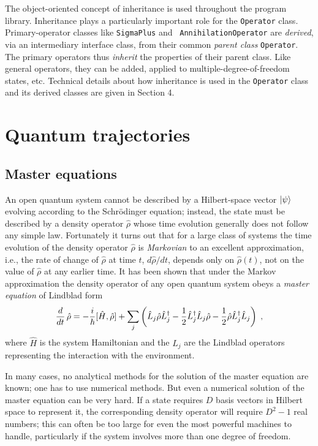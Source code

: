 The object-oriented concept of inheritance is used throughout the program
library. Inheritance plays a particularly important role for the {\tt Operator}
class. Primary-operator classes like {\tt SigmaPlus} and {\tt
AnnihilationOperator} are {\it derived}, via an intermediary interface class,
from their common {\it parent class\/} {\tt Operator}. The primary operators
thus {\it inherit} the properties of their parent class. Like general
operators, they can be added, applied to multiple-degree-of-freedom states,
etc. Technical details about how inheritance is used in the {\tt Operator}
class and its derived classes are given in Section 4.


\section{Quantum trajectories}

\subsection{Master equations}

An open quantum system cannot be described by a
Hilbert-space vector $| \psi \rangle$ evolving according to the
Schr\"odinger equation; instead, the state
must be described by a density operator $\hat\rho$ whose time
evolution generally does not follow any simple law. Fortunately it
turns out that for a large class of systems the time evolution of the
density operator $\hat\rho$ is {\it Markovian\/} to an excellent
approximation, i.e., the rate of change of $\hat\rho$ at time $t$,
$d\hat\rho/dt$, depends only on $\hat\rho(t)$, not on the value of
$\hat\rho$ at any earlier time. It has been shown that under the
Markov approximation the density operator of any open quantum system
obeys 
a {\it master equation\/} of Lindblad form \cite{Lindblad1976}
\begin{equation}
{d\over{dt}}\,\hat\rho =
 -{i\over\hbar}[\hat H,\hat\rho] +
 \sum_j\left(\hat L_j\hat\rho \hat L_j^\dagger
 - {1\over2} \hat L_j^\dagger\hat L_j\hat\rho   - {1\over2}\hat\rho
 \hat L_j^\dagger\hat L_j\right) \;,
\label{eqmaster}
\end{equation}
where $\hat H$ is the system Hamiltonian and the $\hat L_j$ are the
Lindblad operators representing the interaction with the environment.

In many cases, no analytical methods for the solution of the master
equation are known; one has to use numerical methods. But even a
numerical solution of the master equation can be very hard. 
If a state requires $D$ basis vectors
in Hilbert space to represent it, the corresponding density operator
will require $D^2 - 1$ real numbers; this can often be too large for
even the most powerful machines to handle, particularly if the system
involves more than one degree of freedom. 

